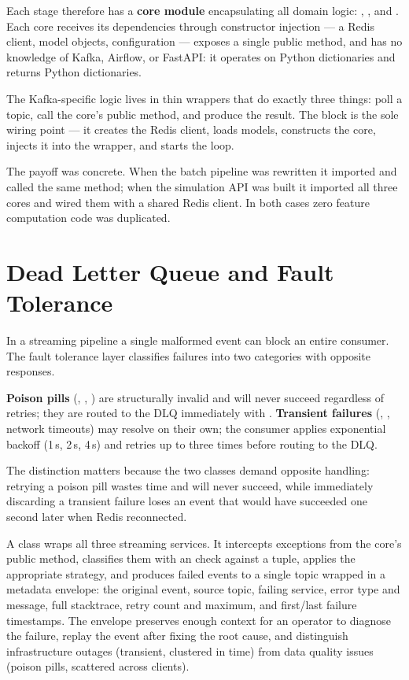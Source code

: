Each stage therefore has a \textbf{core module} encapsulating all domain logic: , , and . Each core receives its dependencies through constructor injection --- a Redis client, model objects, configuration --- exposes a single public method, and has no knowledge of Kafka, Airflow, or FastAPI: it operates on Python dictionaries and returns Python dictionaries.

The Kafka-specific logic lives in thin wrappers that do exactly three things: poll a topic, call the core's public method, and produce the result. The  block is the sole wiring point --- it creates the Redis client, loads models, constructs the core, injects it into the wrapper, and starts the loop.

The payoff was concrete. When the batch pipeline was rewritten it imported  and called the same  method; when the simulation API was built it imported all three cores and wired them with a shared Redis client. In both cases zero feature computation code was duplicated.

\section{Dead Letter Queue and Fault Tolerance}

In a streaming pipeline a single malformed event can block an entire consumer. The fault tolerance layer classifies failures into two categories with opposite responses.

\textbf{Poison pills} (, , ) are structurally invalid and will never succeed regardless of retries; they are routed to the DLQ immediately with . \textbf{Transient failures} (, , network timeouts) may resolve on their own; the consumer applies exponential backoff (1\,s, 2\,s, 4\,s) and retries up to three times before routing to the DLQ.

The distinction matters because the two classes demand opposite handling: retrying a poison pill wastes time and will never succeed, while immediately discarding a transient failure loses an event that would have succeeded one second later when Redis reconnected.

A  class wraps all three streaming services. It intercepts exceptions from the core's public method, classifies them with an  check against a  tuple, applies the appropriate strategy, and produces failed events to a single  topic wrapped in a metadata envelope: the original event, source topic, failing service, error type and message, full stacktrace, retry count and maximum, and first/last failure timestamps. The envelope preserves enough context for an operator to diagnose the failure, replay the event after fixing the root cause, and distinguish infrastructure outages (transient, clustered in time) from data quality issues (poison pills, scattered across clients).

